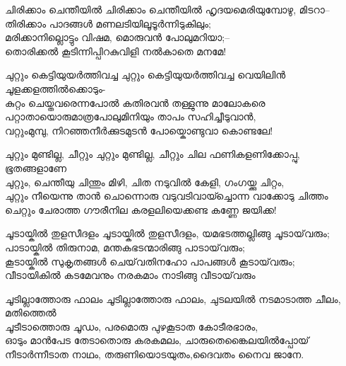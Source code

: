 \begin{enumerate}
\begin{slokam}{\VSk}{\UN}{ചിരിക്കാം ചെന്തീയിൽ}
ചിരിക്കാം ചെന്തീയിൽ ഹൃദയമെരിയുമ്പോഴു, മിടറാ--\\
തിരിക്കാം പാദങ്ങൾ മണലടിയിലൂടൂർന്നിടുകിലും;\\
മരിക്കാനില്ലൊട്ടും വിഷമ, മൊരുവൻ പോലുമറിയാ;--\\
തൊരിക്കൽ കൂടിന്നിപ്പിറകുവിളി നൽകാതെ മനമേ!
\end{slokam}


\begin{slokam}{\VSv}{\HM}{ചുറ്റും കെട്ടിയുയർത്തിവച്ച}
ചുറ്റും കെട്ടിയുയർത്തിവച്ച വെയിലിൻ ചൂളക്കളത്തിൽക്കൊടും-\\
കുറ്റം ചെയ്തവരെന്നപോൽ കതിരവൻ തള്ളുന്നു മാലോകരെ \\
പറ്റാതായൊരുമാത്രപോലുമിനിയും താപം സഹിച്ചീടുവാൻ,\\
വറ്റുംമുമ്പു, നിറഞ്ഞനീർക്കുടമുടൻ പോയ്കൊണ്ടുവാ കൊണ്ടലേ!
\end{slokam}



\begin{slokam}{\VSr}{\PVRI}{ചുറ്റും മുണ്ടില്ല, ചീറ്റും}
ചുറ്റും മുണ്ടില്ല, ചീറ്റും ചില ഫണികളണിക്കോപ്പു, ഭൂതങ്ങളാണേ\\
ചുറ്റും, ചെന്തീയു ചിന്തും മിഴി, ചിത നടുവിൽ കേളി, ഗംഗയ്ക്കു ചിറ്റം,\\
ചുറ്റും നീയെന്നു താൻ ചൊന്നൊരു വടുവടിവായ്ച്ചൊന്ന വാക്കോടു ചിത്തം\\
ചെറ്റും ചേരാത്ത ഗൗരീനില കരളലിയെക്കണ്ട കണ്ണേ ജയിക്ക!
\end{slokam}


\begin{slokam}{\VSv}{\VenV}{ചൂടായ്കിൽ തുളസീദളം}
ചൂടായ്കിൽ തുളസീദളം, യമഭടത്തല്ലിങ്ങു ചൂടായ്‌വരും;\\
പാടായ്കിൽ തിരുനാമ, മന്തകഭടന്മാരിങ്ങു പാടായ്‌വരും;\\
കൂടായ്കിൽ സുകൃതങ്ങള്‍ ചെയ്‌വതിനഹോ പാപങ്ങള്‍ കൂടായ്‌വരും;\\
വീടായികിൽ കടമേവനും നരകമാം നാടിങ്ങു വീടായ്‌വരും
\end{slokam}


\begin{slokam}{\VSr}{\Unk}{ചൂടില്ലാത്തോരു ഫാലം}
ചൂടില്ലാത്തോരു ഫാലം, ചുടലയിൽ നടമാടാത്ത ചീലം, മതിത്തെൽ\\
ചൂടീടാത്തൊരു ചൂഡം, പരമൊരു പുഴകൂടാത കോടീരഭാരം,\\
ഓടും മാൻപേട തേടാതൊരു കരകമലം, ചാരുതെങ്കൈലയിൽപ്പോയ്‌\\
നീടാർന്നീടാത നാഥം, തരുണിയൊടയുതം,ദൈവതം നൈവ ജാനേ.
\end{slokam}


\end{enumerate}
